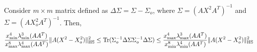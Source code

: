 \documentclass[onecolumn]{IEEEtran}
\begin{document}
\begin{lemma}\label{lemma:vector}
Consider $m\times m$ matrix defined as $\Delta \Sigma=\Sigma-\Sigma_o$, where $\Sigma=(AX^2A^T)^{-1}$ and $\Sigma=(AX_o^2A^T)^{-1}$.  Then,
\[
  {x^4_{\min} \lambda^3_{\min}(AA^T) \over x^8_{\max} \lambda^4_{\max}(AA^T)  }\|A(X^2-X_o^2)\|^2_{\rm HS}
 \leq {\rm Tr}(\Sigma_o^{-1}\Delta \Sigma\Sigma_o^{-1}\Delta \Sigma)\leq {x^4_{\max} \lambda^3_{\max}(AA^T) \over x_{\min}^8 \lambda^4_{\min}(AA^T)  }\|A(X^2-X_o^2)\|^2_{\rm HS} %
\]
\end{lemma}
\end{document}
